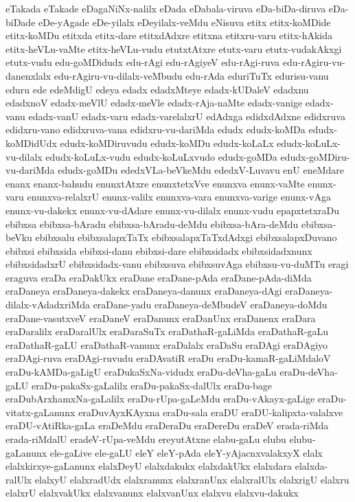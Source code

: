 {eTakada
eTakade
eDagaNiNx-nalilx
eDada
eDabala-viruva
eDa-biDa-diruva
eDa-biDade
eDe-yAgade
eDe-yilalx
eDeyilalx-veMdu
eNisuva
etitx
etitx-koMDide
etitx-koMDu
etitxda
etitx-dare
etitxdAdxre
etitxna
etitxru-varu
etitx-hAkida
etitx-heVLu-vaMte
etitx-heVLu-vudu
etutxtAtxre
etutx-varu
etutx-vudakAkxgi
etutx-vudu
edu-goMDidudx
edu-rAgi
edu-rAgiyeV
edu-rAgi-ruva
edu-rAgiru-vu-danenxlalx
edu-rAgiru-vu-dilalx-veMbudu
edu-rAda
eduriTuTx
edurisu-vanu
eduru
ede
edeMdigU
edeya
edadx
edadxMteye
edadx-kUDaleV
edadxnu
edadxnoV
edadx-meVlU
edadx-meVle
edadx-rAja-naMte
edadx-vanige
edadx-vanu
edadx-vanU
edadx-varu
edadx-varelalxrU
edAdxga
edidxdAdxne
edidxruva
edidxru-vano
edidxruva-vana
edidxru-vu-dariMda
edudx
edudx-koMDa
edudx-koMDidUdx
edudx-koMDiruvudu
edudx-koMDu
edudx-koLaLx
edudx-koLuLx-vu-dilalx
edudx-koLuLx-vudu
edudx-koLuLxvudo
edudx-goMDa
edudx-goMDiru-vu-dariMda
edudx-goMDu
ededxVLa-beVkeMdu
ededxV-Luvavu
enU
eneMdare
enanx
enanx-bahudu
enunxtAtxre
enunxtetxVve
enunxva
enunx-vaMte
enunx-varu
enunxva-relalxrU
enunx-valilx
enunxva-vara
enunxva-varige
enunx-vAga
enunx-vu-dakekx
enunx-vu-dAdare
enunx-vu-dilalx
enunx-vudu
epapxtetxraDu
ebibxsa
ebibxsa-bAradu
ebibxsa-bAradu-deMdu
ebibxsa-bAra-deMdu
ebibxsa-beVku
ebibxsalu
ebibxsalapxTaTx
ebibxsalapxTaTxdAdxgi
ebibxsalapxDuvano
ebibxsi
ebibxsida
ebibxsi-danu
ebibxsi-dare
ebibxsidadx
ebibxsidadxnunx
ebibxsidadxrU
ebibxsidadx-vanu
ebibxsuva
ebibxsuvAga
ebibxsu-vu-duMTu
eragi
eraguva
eraDa
eraDakUkx
eraDane
eraDane-pAda
eraDane-pAda-diMda
eraDaneya
eraDaneya-dakekx
eraDaneya-danunx
eraDaneya-dAgi
eraDaneya-dilalx-vAdadxriMda
eraDane-yadu
eraDaneya-deMbudeV
eraDaneya-doMdu
eraDane-vasutxveV
eraDaneV
eraDanunx
eraDanUnx
eraDanenx
eraDara
eraDaralilx
eraDaralUlx
eraDaraSuTx
eraDathaR-gaLiMda
eraDathaR-gaLu
eraDathaR-gaLU
eraDathaR-vanunx
eraDalalx
eraDaSu
eraDAgi
eraDAgiyo
eraDAgi-ruva
eraDAgi-ruvudu
eraDAvatiR
eraDu
eraDu-kamaR-gaLiMdaloV
eraDu-kAMDa-gaLigU
eraDukaSxNa-vidudx
eraDu-deVha-gaLu
eraDu-deVha-gaLU
eraDu-pakaSx-gaLalilx
eraDu-pakaSx-dalUlx
eraDu-bage
eraDubArxhamxNa-gaLalilx
eraDu-rUpa-gaLeMdu
eraDu-vAkayx-gaLige
eraDu-vitatx-gaLanunx
eraDuvAyxKAyxna
eraDu-sala
eraDU
eraDU-kalipxta-valalxve
eraDU-vAtiRka-gaLa
eraDeMdu
eraDeraDu
eraDereDu
eraDeV
erada-riMda
erada-riMdalU
eradeV-rUpa-veMdu
ereyutAtxne
elabu-gaLu
elubu
elubu-gaLanunx
ele-gaLive
ele-gaLU
eleY
eleY-pAda
eleY-yAjacnxvalakxyX
elalx
elalxkirxye-gaLanunx
elalxDeyU
elalxdakukx
elalxdakUkx
elalxdara
elalxda-ralUlx
elalxyU
elalxradUdx
elalxranunx
elalxranUnx
elalxralUlx
elalxrigU
elalxru
elalxrU
elalxvakUkx
elalxvanunx
elalxvanUnx
elalxvu
elalxvu-dakukx
}
